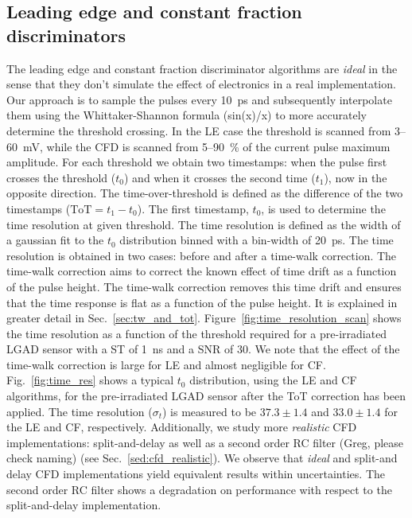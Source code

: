 \documentclass[preprint,1p]{elsarticle}
\begin{document}
\subsection{Leading edge and constant fraction discriminators}\label{sec:le_and_cfd}
The leading edge and constant fraction discriminator algorithms are \textit{ideal} in the sense that they don't simulate the effect of
electronics in a real implementation. Our approach is to sample the pulses every 10~\si{ps} and subsequently interpolate them
using the Whittaker-Shannon formula (sin(x)/x) to more accurately determine the threshold crossing. In the LE case the threshold is scanned
from 3--60~\si{mV}, while the CFD is scanned from 5--90~\% of the current pulse maximum amplitude. For each threshold we obtain two
timestamps: when the pulse first crosses the threshold ($t_{0}$) and when it crosses the second time ($t_{1}$), now in the opposite
direction. The time-over-threshold is defined as the difference of the two timestamps ($\mathrm{ToT} = t_{1} - t_{0}$). The first
timestamp, $t_{0}$, is used to determine the time resolution at given threshold. The time resolution is defined as the width of
a gaussian fit to the $t_{0}$ distribution binned with a bin-width of 20~\si{ps}. The time resolution is obtained in two cases:
before and after a time-walk correction. The time-walk correction aims to correct the known effect of time drift as a function
of the pulse height. The time-walk correction removes this time drift and ensures that the time response is flat as a function
of the pulse height. It is explained in greater detail in Sec.~\ref{sec:tw_and_tot}.
Figure~\ref{fig:time_resolution_scan} shows the time resolution as a function
of the threshold required for a pre-irradiated LGAD sensor with a ST of 1~\si{ns} and a SNR of 30.
We note that the effect of the time-walk correction is large for LE and almost negligible for CF.
Fig.~\ref{fig:time_res} shows a typical $t_{0}$ distribution, using the LE and CF algorithms, for the pre-irradiated
LGAD sensor after the ToT correction has been applied. The time resolution ($\sigma_{t}$) is measured to be $37.3 \pm 1.4 $
and $33.0 \pm 1.4$ for the LE and CF, respectively. Additionally, we study more \textit{realistic} CFD implementations:
{\color{red}split-and-delay as well as a second order RC filter (Greg, please check naming)} (see Sec.~\ref{sed:cfd_realistic}).
 We observe that \textit{ideal} and split-and delay CFD implementations yield equivalent results within uncertainties.
 The second order RC filter shows a degradation on performance with respect to the split-and-delay implementation.
\end{document}
